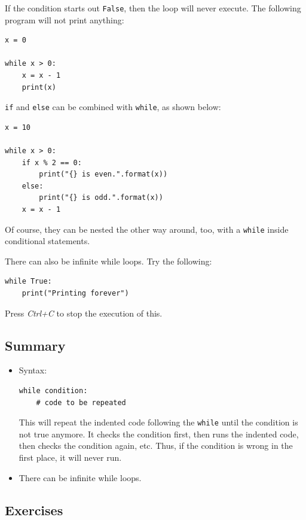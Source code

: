 \documentclass[11pt]{cselabheader}
\begin{document}
If the condition starts out \lstinline{False}, then the loop will never execute.
The following program will not print anything:

\begin{lstlisting}[style=python]
x = 0

while x > 0:
    x = x - 1
    print(x)
\end{lstlisting}

\lstinline{if} and \lstinline{else} can be combined with \lstinline{while}, as
shown below:

\begin{lstlisting}[style=python]
x = 10

while x > 0:
    if x % 2 == 0:
        print("{} is even.".format(x))
    else:
        print("{} is odd.".format(x))
    x = x - 1
\end{lstlisting}

Of course, they can be nested the other way around, too, with a
\lstinline!while! inside conditional statements.

There can also be infinite while loops. Try the following:
\begin{lstlisting}
while True:
    print("Printing forever")
\end{lstlisting}

Press \emph{Ctrl+C} to stop the execution of this.

\subsection{Summary}

\begin{itemize}
  \item Syntax:
    \begin{lstlisting}
while condition:
    # code to be repeated
    \end{lstlisting}

    This will repeat the indented code following the \lstinline!while! until the
    condition is not true anymore. It checks the condition first, then runs the
    indented code, then checks the condition again, etc. Thus, if the condition
    is wrong in the first place, it will never run.

  \item There can be infinite while loops.
\end{itemize}

\subsection{Exercises}
\label{subsec:whileex}
\end{document}

